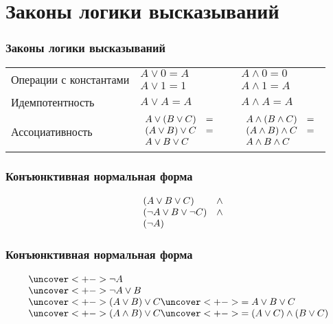 \documentclass[24pt,pdf,hyperref={unicode}]{beamer}
\begin{document}
\section{Законы логики высказываний}
\begin{frame}\frametitle{Законы логики высказываний}
\begin{tabular}{l l p{1cm} l}
\multirow{2}{*}{Операции с константами} & $A\vee 0 = A$ && $A\wedge 0=0$ \\
					& $A\vee 1 = 1$ && $A\wedge 1=A$ \\ 		
Идемпотентность & $A\vee A = A$ && $A \wedge A = A$ \\
Ассоциативность & $\begin{array}{l l}
		    A\vee (B\vee C) & = \\
		    (A\vee B)\vee C & = \\
		    A\vee B\vee C
		    \end{array}$
				     &&
					$\begin{array}{l l}
					  A\wedge (B\wedge C) & = \\
					  (A\wedge B)\wedge C & = \\
					  A\wedge B\wedge C
					  \end{array}$ \\
							 
\end{tabular}
\end{frame}

\begin{frame}\frametitle{Конъюнктивная нормальная форма}

$$
\begin{array}{l l l}
& (A \vee B \vee C) & \wedge \\
& (\neg A \vee B \vee \neg C) & \wedge \\
& (\neg A)
\end{array}
$$
\end{frame}

\begin{frame}\frametitle{Конъюнктивная нормальная форма}
$$
\begin{array}{l}
\uncover<+->{ \neg A } \\
\uncover<+->{ \neg A \vee B } \\
\uncover<+->{ (A \vee B) \vee C } \uncover<+->{ = A\vee B\vee C }\\
\uncover<+->{ (A \wedge B) \vee C } \uncover<+->{ = (A\vee C)\wedge (B\vee C)}\\
\end{array}
$$
\end{frame}
\end{document}
